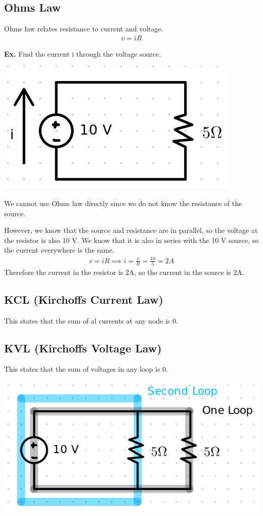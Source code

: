 \documentclass[12pt,letterpaper]{article} \usepackage{amsmath} \usepackage{graphicx} \usepackage[margin=1in]{geometry} \usepackage{longtable}  \usepackage{amssymb}
\begin{document}
	\subsection{Ohms Law}
	Ohms law relates resistance to current and voltage. 
	\begin{align*}
		v=iR
	\end{align*}

	\begin{mdframed}[]
	\textbf{Ex.} Find the current i through the voltage source.
	\begin{center}
		\includegraphics[width=0.35\linewidth]{ex1}
	\end{center}
	We cannot use Ohms law directly since we do not know the resistance of the source.
	
	However, we know that the source and resistance are in parallel, so the voltage at the resistor is also 10 V. We know that it is also in series with the 10 V source, so the current everywhere is the same. 
	\begin{align*}
		v=iR \implies i=\frac{v}{R} = \frac{10}{5} = 2A
	\end{align*}
	Therefore the current in the resistor is 2A, so the current in the source is 2A.
	
	\end{mdframed}
	
	\subsection{KCL (Kirchoffs Current Law)}
	This states that the sum of al currents at any node is 0.
	
	\subsection{KVL (Kirchoffs Voltage Law)}
	This states that the sum of voltages in any loop is 0.
	\begin{center}
		\includegraphics[width=0.4\linewidth]{loop}
	\end{center}
	
\end{document}
